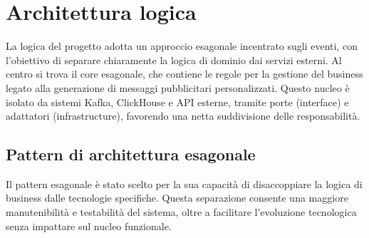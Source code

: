 \documentclass[10pt]{article}
\begin{document}
    \section{Architettura logica}

    La logica del progetto adotta un approccio esagonale incentrato sugli eventi, con l'obiettivo di separare chiaramente la logica di dominio dai servizi esterni. Al centro si trova il core esagonale, che contiene le regole per la gestione del business legato alla generazione di messaggi pubblicitari personalizzati. Questo nucleo è isolato da sistemi Kafka, ClickHouse e API esterne, tramite porte (interface) e adattatori (infrastructure), favorendo una netta suddivisione delle responsabilità.


    \subsection{Pattern di architettura esagonale}

    Il pattern esagonale è stato scelto per la sua capacità di disaccoppiare la logica di business dalle tecnologie specifiche. Questa separazione consente una maggiore manutenibilità e testabilità del sistema, oltre a facilitare l'evoluzione tecnologica senza impattare sul nucleo funzionale.
\end{document}
